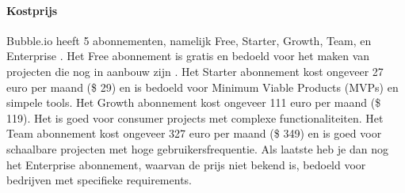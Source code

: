 \paragraph{Kostprijs}
Bubble.io heeft 5 abonnementen, namelijk Free, Starter, Growth, Team, en Enterprise \autocite{Bubble2024}.
Het Free abonnement is gratis en bedoeld voor het maken van projecten die nog in aanbouw zijn \autocite{Bubble2024}.
Het Starter abonnement kost ongeveer 27 euro per maand (\$ 29) en is bedoeld voor Minimum Viable Products (MVPs) en simpele tools.
Het Growth abonnement kost ongeveer 111 euro per maand (\$ 119). Het is goed voor consumer projects met complexe functionaliteiten.
Het Team abonnement kost ongeveer 327 euro per maand (\$ 349) en is goed voor schaalbare projecten met hoge gebruikersfrequentie. Als laatste heb je dan nog
het Enterprise abonnement, waarvan de prijs niet bekend is, bedoeld voor bedrijven met specifieke requirements.

